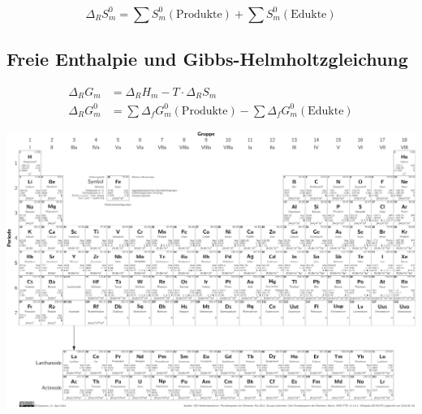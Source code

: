 \begin{equation}
\Delta_R S_m^0 = \sum S_m^0\left(\text{Produkte}\right) + \sum S_m^0\left(\text{Edukte}\right)
\end{equation}

\subsection{Freie Enthalpie und Gibbs-Helmholtzgleichung}

\begin{align}
\Delta_R G_m &= \Delta_R H_m - T \cdot \Delta_R S_m\\
\Delta_R G_m^0 &= \sum\Delta_fG_m^0\left(\text{Produkte}\right) - \sum\Delta_fG_m^0\left(\text{Edukte}\right)
\end{align}


{\onecolumn
\includegraphics[angle=90,height=\textheight]{elemente/periodictable_monochrome}
}